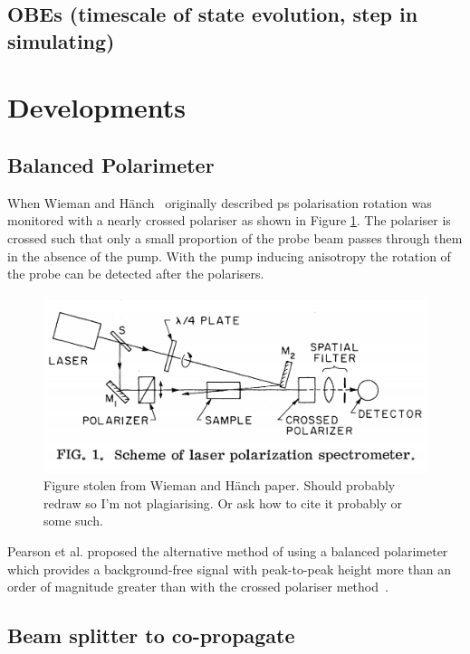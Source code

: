 \subsection{OBEs (timescale of state evolution, step in simulating)}
\section{Developments}
\subsection{Balanced Polarimeter}
When Wieman and H\"anch~\cite{wieman_doppler-free_1976} originally described \gls{ps} polarisation rotation was monitored with a nearly crossed polariser as shown in Figure \ref{figure:wieman_doppler-free_schematic}.
The polariser is crossed such that only a small proportion of the probe beam passes through them in the absence of the pump.
With the pump inducing anisotropy the rotation of the probe can be detected after the polarisers.

\begin{figure}
\includegraphics[width=\linewidth]{chapter1/Figs/wieman_doppler-free_schematic.png}
\caption{Figure stolen from Wieman and H\"anch paper.
Should probably redraw so I'm not plagiarising.
Or ask how to cite it probably or some such.}
\label{figure:wieman_doppler-free_schematic}
\end{figure}

Pearson et al. proposed the alternative method of using a balanced polarimeter which provides a background-free signal with peak-to-peak height more than an order of magnitude greater than with the crossed polariser method~\cite{pearman_polarization_2002}.

\subsection{Beam splitter to co-propagate}

